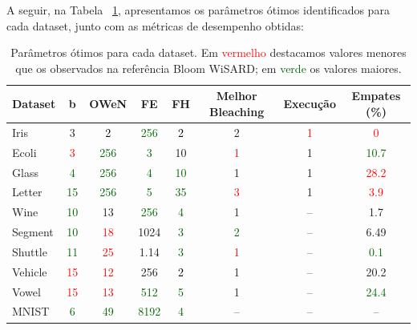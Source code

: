 \documentclass{article}
\begin{document}
A seguir, na Tabela ~\ref{tab:Opt-params}, apresentamos os parâmetros ótimos identificados para cada dataset, junto com as métricas de desempenho obtidas:

{\small
\begin{table}[H]
\caption{Parâmetros ótimos para cada dataset. Em \textcolor{red}{vermelho} destacamos valores menores que os observados na referência Bloom WiSARD; em \textcolor{darkgreen}{verde} os valores maiores.}
\label{tab:Opt-params}
\renewcommand{\arraystretch}{1.1}
\begin{center}
\begin{tabular}{lccccccc}
\hline
\textbf{Dataset} & \textbf{b} & \textbf{OWeN} & \textbf{FE} & \textbf{FH} & \textbf{Melhor Bleaching} & \textbf{Execução} & \textbf{Empates (\%)} \\
\hline
Iris & 3 & \textcolor{black}{2} & \textcolor{darkgreen}{256} & \textcolor{black}{2} & 2 & \textcolor{red}{1} & \textcolor{red}{0} \\
Ecoli & \textcolor{red}{3} & \textcolor{darkgreen}{256} & \textcolor{darkgreen}{3} & 10 & \textcolor{red}{1} & 1 & \textcolor{darkgreen}{10.7} \\
Glass & \textcolor{darkgreen}{4} & \textcolor{darkgreen}{256} & \textcolor{darkgreen}{4} & \textcolor{darkgreen}{10} & 1 & 1 & \textcolor{red}{28.2} \\
Letter & \textcolor{darkgreen}{15} & \textcolor{darkgreen}{256} & \textcolor{darkgreen}{5} & \textcolor{darkgreen}{35} & \textcolor{red}{3} & 1 & \textcolor{red}{3.9} \\
Wine & \textcolor{darkgreen}{10} & 13 & \textcolor{darkgreen}{256} & \textcolor{darkgreen}{4} & 1 & -- & 1.7 \\
Segment & \textcolor{darkgreen}{10} & \textcolor{red}{18} & 1024 & \textcolor{darkgreen}{3} & \textcolor{darkgreen}{2} & -- & 6.49 \\
Shuttle & \textcolor{darkgreen}{11} & \textcolor{red}{25} & 1.14 & \textcolor{darkgreen}{3} & \textcolor{red}{1} & -- & \textcolor{darkgreen}{0.1} \\
Vehicle & \textcolor{red}{15} & \textcolor{red}{12} & 256 & \textcolor{black}{2} & 1 & -- & 20.2 \\
Vowel & \textcolor{red}{15} & \textcolor{red}{13} & \textcolor{darkgreen}{512} & \textcolor{darkgreen}{5} & 1 & -- & \textcolor{darkgreen}{24.4} \\
MNIST & \textcolor{darkgreen}{6} & \textcolor{darkgreen}{49} & \textcolor{darkgreen}{8192} & \textcolor{darkgreen}{4} & -- & -- & -- \\
\hline
\end{tabular}
\end{center}
\end{table}
}
\end{document}
